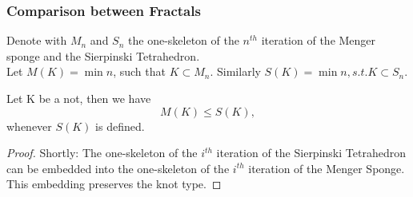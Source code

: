 \begin{frame}
	\frametitle{Comparison between Fractals} %
	Denote with $M_n$ and $S_n$ the one-skeleton of the $n^{th}$ iteration of the Menger sponge and the Sierpinski Tetrahedron.\\
	Let $M(K)=\min{n}$, such that $K\subset M_n$. Similarly $S(K)=\min{n}, s.t. K\subset S_n$.\\
	\onslide<2->
	\begin{theorem}
		Let K be a not, then we have
		$$M(K)\leq S(K),$$
		whenever $S(K)$ is defined. \cite{broden2024knotsinsidefractals}
	\end{theorem}
	
	\begin{proof}
		Shortly: The one-skeleton of the $i^{th}$ iteration of the Sierpinski Tetrahedron can be embedded into the one-skeleton of the $i^{th}$ iteration of the Menger Sponge. This embedding preserves the knot type.
	\end{proof}
\end{frame}

